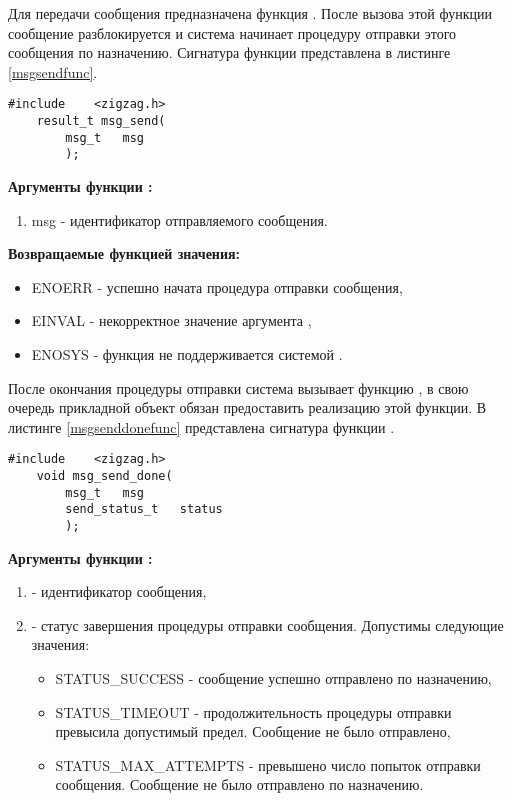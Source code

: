 Для передачи сообщения предназначена функция . После вызова этой функции
сообщение разблокируется и система \zigzag начинает процедуру отправки этого сообщения по назначению.
Сигнатура функции  представлена в листинге \ref{msgsendfunc}.

\begin{lstlisting}[caption=Функция \myfunc{msg\_send()} - отправка сообщения., label=msgsendfunc ]
    #include    <zigzag.h>
    result_t msg_send(
        msg_t   msg
        );
\end{lstlisting}

{\bfseries Аргументы функции :}

{\itshape
\begin{enumerate}
\item msg - идентификатор отправляемого сообщения.
\end{enumerate}
}

{\bfseries Возвращаемые функцией  значения:}

{\itshape
\begin{itemize}
\item ENOERR - успешно начата процедура отправки сообщения,
\item EINVAL - некорректное значение аргумента ,
\item ENOSYS - функция не поддерживается системой \zigzag.
\end{itemize}
}

После окончания процедуры отправки система \zigzag вызывает функцию ,
в свою очередь прикладной объект обязан предоставить реализацию этой функции. В листинге \ref{msgsenddonefunc} представлена 
сигнатура функции .

\begin{lstlisting}[caption=Функция \myfunc{msg\_send\_done()} - окончание отправки, label=msgsenddonefunc ]
    #include    <zigzag.h>
    void msg_send_done(
        msg_t   msg
        send_status_t   status
        );
\end{lstlisting}

{\bfseries Аргументы функции :}

{\itshape
\begin{enumerate}
\item {} - идентификатор сообщения,
\item {} - статус завершения процедуры отправки сообщения. Допустимы следующие значения:
\begin{itemize}
\item STATUS\_SUCCESS - сообщение успешно отправлено по назначению,
\item STATUS\_TIMEOUT - продолжительность процедуры отправки превысила допустимый предел. Сообщение
не было отправлено,
\item STATUS\_MAX\_ATTEMPTS - превышено число попыток отправки сообщения. Сообщение не было отправлено по 
назначению.
\end{itemize}
\end{enumerate}
}
